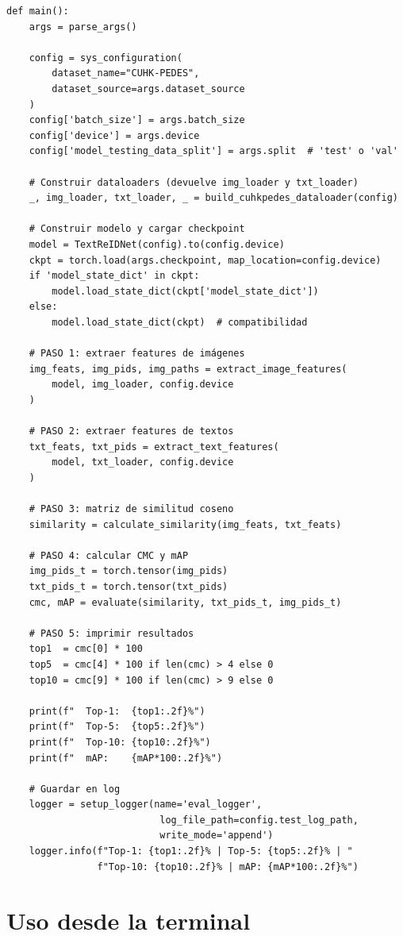 \begin{verbatim}
def main():
    args = parse_args()

    config = sys_configuration(
        dataset_name="CUHK-PEDES",
        dataset_source=args.dataset_source
    )
    config['batch_size'] = args.batch_size
    config['device'] = args.device
    config['model_testing_data_split'] = args.split  # 'test' o 'val'

    # Construir dataloaders (devuelve img_loader y txt_loader)
    _, img_loader, txt_loader, _ = build_cuhkpedes_dataloader(config)

    # Construir modelo y cargar checkpoint
    model = TextReIDNet(config).to(config.device)
    ckpt = torch.load(args.checkpoint, map_location=config.device)
    if 'model_state_dict' in ckpt:
        model.load_state_dict(ckpt['model_state_dict'])
    else:
        model.load_state_dict(ckpt)  # compatibilidad

    # PASO 1: extraer features de imágenes
    img_feats, img_pids, img_paths = extract_image_features(
        model, img_loader, config.device
    )

    # PASO 2: extraer features de textos
    txt_feats, txt_pids = extract_text_features(
        model, txt_loader, config.device
    )

    # PASO 3: matriz de similitud coseno
    similarity = calculate_similarity(img_feats, txt_feats)

    # PASO 4: calcular CMC y mAP
    img_pids_t = torch.tensor(img_pids)
    txt_pids_t = torch.tensor(txt_pids)
    cmc, mAP = evaluate(similarity, txt_pids_t, img_pids_t)

    # PASO 5: imprimir resultados
    top1  = cmc[0] * 100
    top5  = cmc[4] * 100 if len(cmc) > 4 else 0
    top10 = cmc[9] * 100 if len(cmc) > 9 else 0

    print(f"  Top-1:  {top1:.2f}%")
    print(f"  Top-5:  {top5:.2f}%")
    print(f"  Top-10: {top10:.2f}%")
    print(f"  mAP:    {mAP*100:.2f}%")

    # Guardar en log
    logger = setup_logger(name='eval_logger',
                           log_file_path=config.test_log_path,
                           write_mode='append')
    logger.info(f"Top-1: {top1:.2f}% | Top-5: {top5:.2f}% | "
                f"Top-10: {top10:.2f}% | mAP: {mAP*100:.2f}%")
\end{verbatim}

\section{Uso desde la terminal}

